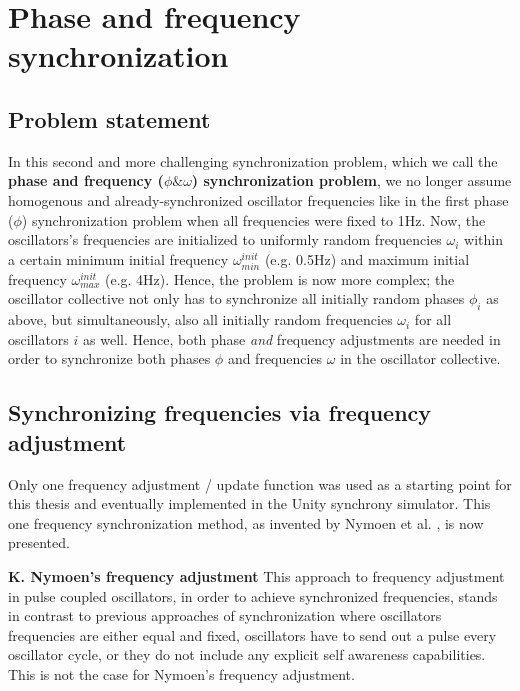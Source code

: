 


\section{Phase and frequency synchronization}
\label{sec:nymoen_freq_updates}

	\subsection{Problem statement}

	In this second and more challenging synchronization problem, which we call the \textbf{phase and frequency ($\phi \& \omega$) synchronization problem}, we no longer assume homogenous and already-synchronized oscillator frequencies like in the first phase ($\phi$) synchronization problem when all frequencies were fixed to 1Hz. Now, the oscillators's frequencies are initialized to uniformly random frequencies $\omega_i$ within a certain minimum initial frequency $\omega_{min}^{init}$ (e.g. 0.5Hz) and maximum initial frequency $\omega_{max}^{init}$ (e.g. 4Hz).
	Hence, the problem is now more complex; the oscillator collective not only has to synchronize all initially random phases $\phi_i$ as above, but simultaneously, also all initially random frequencies $\omega_i$ for all oscillators $i$ as well. Hence, both phase \textit{and} frequency adjustments are needed in order to synchronize both phases $\phi$ and frequencies $\omega$ in the oscillator collective.


	\subsection{Synchronizing frequencies via frequency adjustment}

	Only one frequency adjustment / update function was used as a starting point for this thesis and eventually implemented in the Unity synchrony simulator. This one frequency synchronization method, as invented by Nymoen et al. \cite{nymoen_synch}, is now presented. \nl

	\textbf{K. Nymoen's frequency adjustment} \nl
	This approach to frequency adjustment in pulse coupled oscillators, in order to achieve synchronized frequencies, stands in contrast to previous approaches of synchronization where oscillators frequencies are either equal and fixed, oscillators have to send out a pulse every oscillator cycle, or they do not include any explicit self awareness capabilities. This is not the case for Nymoen's frequency adjustment.

